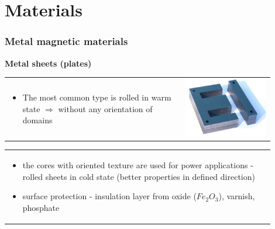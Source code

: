 \documentclass{beamer}
\begin{document}
\section{\texorpdfstring{Materials}{Materials}}
	\begin{frame}
	\frametitle{Metal magnetic materials}
	\textbf{Metal sheets (plates)}
	\begin{tabular}{m{0.6\linewidth} m{0.3\linewidth}}
		\begin{itemize}
		\item The most common type is rolled in warm state $\Rightarrow$ without any orientation of domains
	\end{itemize} 
	& \includegraphics[scale=0.3]{obr09_zelezo.png}
	\end{tabular}
	\begin{tabular}{p{0.9\linewidth}}
	\begin{itemize}
		\item the cores with oriented texture are used for power applications - rolled sheets in cold state (better properties in defined direction)
		\item surface protection - insulation layer from oxide ($Fe_2O_3$), varnish, phosphate
	\end{itemize} 
	\end{tabular}
  \end{frame}
\end{document}
